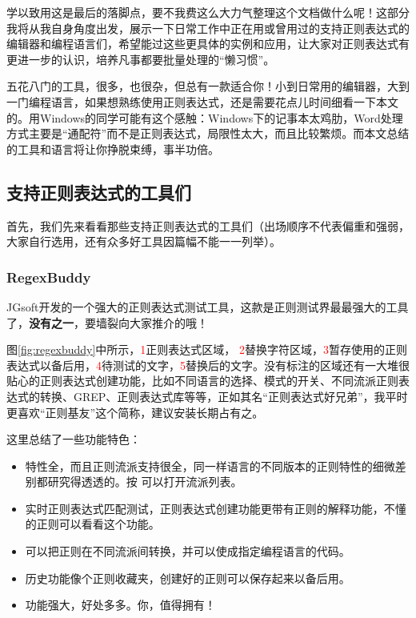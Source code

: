 \documentclass[12pt,a4paper,twoside]{ctexart}
\begin{document}
学以致用这是最后的落脚点，要不我费这么大力气整理这个文档做什么呢！这部分我将从我自身角度出发，展示一下日常工作中正在用或曾用过的支持正则表达式的编辑器和编程语言们，希望能过这些更具体的实例和应用，让大家对正则表达式有更进一步的认识，培养凡事都要批量处理的“懒习惯”。\par

五花八门的工具，很多，也很杂，但总有一款适合你！小到日常用的编辑器，大到一门编程语言，如果想熟练使用正则表达式，还是需要花点儿时间细看一下本文的。用Windows的同学可能有这个感触：Windows下的记事本太鸡肋，Word处理方式主要是“通配符”而不是正则表达式，局限性太大，而且比较繁烦。而本文总结的工具和语言将让你挣脱束缚，事半功倍。\par

\subsection{支持正则表达式的工具们}
\label{sec:regex-tools}

首先，我们先来看看那些支持正则表达式的工具们（出场顺序不代表偏重和强弱，大家自行选用，还有众多好工具因篇幅不能一一列举）。

\subsubsection{RegexBuddy}
\label{sec:regexbuddy}

JGsoft开发的一个强大的正则表达式测试工具，这款是正则测试界最最强大的工具了，\textbf{没有之一}，要墙裂向大家推介的哦！\Smiley \par
图\ref{fig:regexbuddy}中所示，\textcolor{red}{\textcircled{\footnotesize{1}}}正则表达式区域， \textcolor{red}{\textcircled{\footnotesize{2}}}替换字符区域，\textcolor{red}{\textcircled{\footnotesize{3}}}暂存使用的正则表达式以备后用，\textcolor{red}{\textcircled{\footnotesize{4}}}待测试的文字，\textcolor{red}{\textcircled{\footnotesize{5}}}替换后的文字。没有标注的区域还有一大堆很贴心的正则表达式创建功能，比如不同语言的选择、模式的开关、不同流派正则表达式的转换、GREP、正则表达式库等等，正如其名“正则表达式好兄弟”，我平时更喜欢“正则基友”这个简称，\Smiley 建议安装长期占有之。 \par

这里总结了一些功能特色：\par

\begin{itemize}
\item 特性全，而且正则流派支持很全，同一样语言的不同版本的正则特性的细微差别都研究得透透的。按  可以打开流派列表。
\item 实时正则表达式匹配测试，正则表达式创建功能更带有正则的解释功能，不懂的正则可以看看这个功能。
\item 可以把正则在不同流派间转换，并可以使成指定编程语言的代码。
\item 历史功能像个正则收藏夹，创建好的正则可以保存起来以备后用。
\item 功能强大，好处多多。你，值得拥有！
\end{itemize}
\end{document}
